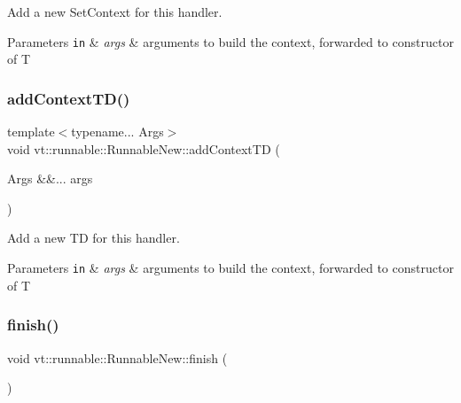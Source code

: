 Add a new {\ttfamily Set\+Context} for this handler. 


\begin{DoxyParams}[1]{Parameters}
\mbox{\tt in}  & {\em args} & arguments to build the context, forwarded to constructor of {\ttfamily T} \\
\hline
\end{DoxyParams}
\mbox{\label{structvt_1_1runnable_1_1_runnable_new_ac2480a813d1adc735051314093b91e1d}} 
\subsubsection{\texorpdfstring{add\+Context\+T\+D()}{addContextTD()}}
{\footnotesize\ttfamily template$<$typename... Args$>$ \\
void vt\+::runnable\+::\+Runnable\+New\+::add\+Context\+TD (\begin{DoxyParamCaption}\item[{Args \&\&...}]{args }\end{DoxyParamCaption})}



Add a new {\ttfamily TD} for this handler. 


\begin{DoxyParams}[1]{Parameters}
\mbox{\tt in}  & {\em args} & arguments to build the context, forwarded to constructor of {\ttfamily T} \\
\hline
\end{DoxyParams}
\mbox{\label{structvt_1_1runnable_1_1_runnable_new_a44e2f15795876230e49c343b64c1414c}} 
\subsubsection{\texorpdfstring{finish()}{finish()}}
{\footnotesize\ttfamily void vt\+::runnable\+::\+Runnable\+New\+::finish (\begin{DoxyParamCaption}{ }\end{DoxyParamCaption})\hspace{0.3cm}{\ttfamily [private]}}



